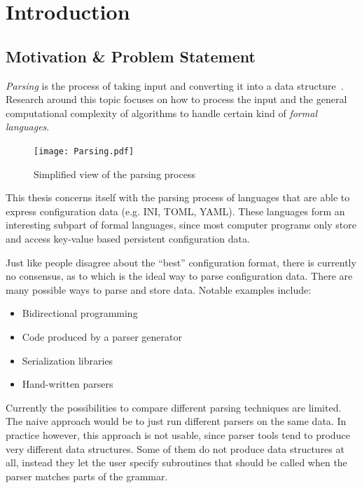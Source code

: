 \chapter{Introduction}

\section{Motivation \& Problem Statement}

\emph{Parsing} is the process of taking input and converting it into a data structure~\cite{wikipedia2016Parser, grune2007parsing}. Research around this topic focuses on how to process the input and the general computational complexity of algorithms to handle certain kind of \emph{formal languages}.

\begin{figure}[H]
  \centering
    \texttt{[image: Parsing.pdf]}
  \caption{Simplified view of the parsing process}
\end{figure}

This thesis concerns itself with the parsing process of languages that are able to express configuration data (e.g. INI, TOML, YAML). These languages form an interesting subpart of formal languages, since most computer programs only store and access key-value based persistent configuration data.

Just like people disagree about the “best” configuration format, there is currently no consensus, as to which is the ideal way to parse configuration data. There are many possible ways to parse and store data. Notable examples include:

\begin{itemize}
  \item Bidirectional programming~\cite{foster2005combinators, bohannon2006relational, lutterkort2008augeas, ko2016bigul, raab2016improving}
  \item Code produced by a parser generator~\cite{denny2008ielr, parr2014adaptive, warth2016modular, bates2017aprt}
  \item Serialization libraries~\cite{sumaray2012cds, pacini2015performance}
  \item Hand-written parsers~\cite{myers2008cparser, bendersky2012clang}
\end{itemize}

Currently the possibilities to compare different parsing techniques are limited. The naive approach would be to just run different parsers on the same data. In practice however, this approach is not usable, since parser tools tend to produce very different data structures. Some of them do not produce data structures at all, instead they let the user specify subroutines that should be called when the parser matches parts of the grammar.

